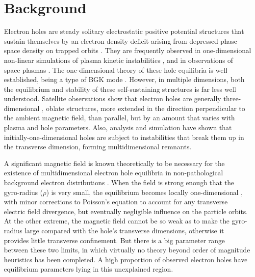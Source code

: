 \documentclass{agujournal2019}
\def\citep{\cite}
\begin{document}
\section{Background}

Electron holes are steady solitary electrostatic positive potential
structures that sustain themselves by an electron density deficit
arising from depressed phase-space density on trapped
orbits \citep{Turikov1984,Schamel1986a,Eliasson2006,Hutchinson2017}. They are
frequently observed in one-dimensional non-linear simulations of
plasma kinetic instabilities \citep{Morse1969,Berk1970,Omura1996,Miyake1998a,Hutchinson2017}, and in observations of space
plasmas \citep{Matsumoto1994,Ergun1998,Bale1998,Mangeney1999,Pickett2008,Andersson2009,Wilson2010,Malaspina2013,Malaspina2014,Vasko2015,Mozer2016,Hutchinson2018b,Mozer2018}. The one-dimensional theory of these hole equilibria is well
established, being a type of BGK mode \citep{Bernstein1957}. However, in multiple
dimensions, both the equilibrium and stability of these self-sustaining
structures is far less well understood. Satellite observations
show that electron holes are generally
three-dimensional \citep{Franz2000,Vasko2017,Holmes2018,Tong2018}, oblate
structures, more extended in the direction perpendicular to the
ambient magnetic field, than parallel, but by an amount that varies
with plasma and hole parameters. Also, analysis and simulation have
shown that initially-one-dimensional holes are subject to
instabilities \citep{Mottez1997,Miyake1998a,Goldman1999,Oppenheim1999,Muschietti2000,Oppenheim2001b,Singh2001,Lu2008,Hutchinson2018,Hutchinson2018a,Hutchinson2019,Hutchinson2019a}
that break them up in the transverse dimension, forming multidimensional remnants.

A significant magnetic field is known theoretically to be necessary
for the existence of multidimensional electron hole equilibria in
non-pathological background electron
distributions \citep{Krasovsky2004,Ng2005,Ng2006}. When the field is
strong enough that the gyro-radius ($\rho$) is very small, the
equilibrium becomes locally one-dimensional \citep{Chen2002,Jovanovic2002a}, with minor corrections to
Poisson's equation to account for any transverse electric field
divergence, but eventually negligible influence on the particle
orbits. At the other extreme, the magnetic field cannot be so weak as
to make the gyro-radius large compared with the hole's transverse
dimensions, otherwise it provides little transverse
confinement. But there is a big parameter range between these two
limits, in which virtually no theory beyond order of magnitude
heuristics has been completed. A high proportion of observed electron
holes have equilibrium parameters lying in this unexplained region.
\end{document}
